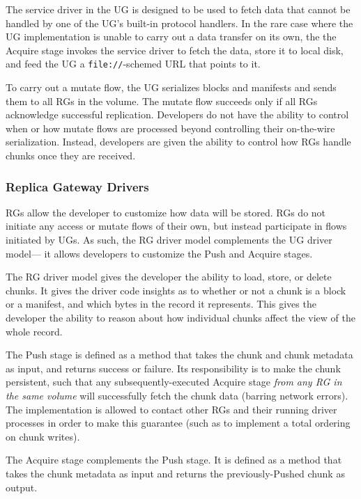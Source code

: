   The service driver in the UG is designed to
be used to fetch data that cannot be handled by one of the UG's built-in
protocol handlers.  In the rare case where the UG implementation is unable to carry out
a data transfer on its own, the the Acquire stage 
invokes the service driver to fetch the data, store it to local disk, and feed the UG a
\texttt{file://}-schemed URL that points to it.

To carry out a mutate flow, the UG serializes blocks and manifests and sends them to all RGs
in the volume.  The mutate flow succeeds only if all RGs
acknowledge successful replication.  Developers do not have the ability to
control when or how mutate flows are processed beyond controlling their
on-the-wire serialization.  Instead, developers are given the
ability to control how RGs handle chunks once they are received.

\subsubsection{Replica Gateway Drivers}

RGs allow the developer to customize how data will be stored.  RGs do not
initiate any access or mutate flows of their own, but instead participate in
flows initiated by UGs.  As such, the RG driver model complements the UG driver model---
it allows developers to customize the Push and Acquire stages.

  The RG driver model gives the developer
the ability to load, store, or delete chunks.  It gives the driver code insights
as to whether or not a chunk is a block or a manifest, and which bytes in the
record it represents.  This gives the developer the ability to reason about how
individual chunks affect the view of the whole record.

The Push stage is defined as a method that takes the chunk and chunk metadata as
input, and returns success or failure.  Its responsibility is to make the chunk
persistent, such that any subsequently-executed Acquire stage \emph{from any
RG in the same volume} will successfully fetch the chunk data (barring network
errors).  The implementation is allowed to contact other RGs and their running
driver processes in order to make this guarantee (such as to implement a total
ordering on chunk writes).

The Acquire stage complements the Push stage.  It is defined as a method that
takes the chunk metadata as input and returns the previously-Pushed chunk as
output.

